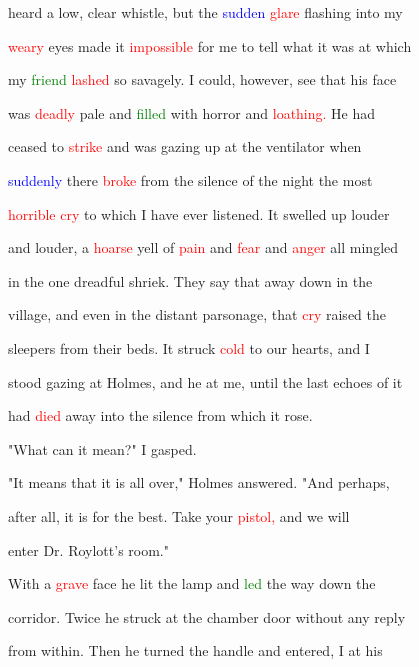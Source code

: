  heard a low, clear whistle, but the \textcolor{blue}{sudden} \textcolor{red}{glare} flashing into my

 \textcolor{red}{weary} eyes made it \textcolor{red}{impossible} for me to tell what it was at which

 my \textcolor{green}{friend} \textcolor{red}{lashed} so savagely. I could, however, see that his face

 was \textcolor{red}{deadly} pale and \textcolor{green}{filled} with \textcolor{BurntOrange}{horror} and \textcolor{red}{loathing.} He had

 ceased to \textcolor{red}{strike} and was gazing up at the ventilator when

 \textcolor{blue}{suddenly} there \textcolor{red}{broke} from the silence of the night the most

 \textcolor{red}{horrible} \textcolor{red}{cry} to which I have ever listened. It swelled up louder

 and louder, a \textcolor{red}{hoarse} \textcolor{BurntOrange}{yell} of \textcolor{red}{pain} and \textcolor{red}{fear} and \textcolor{red}{anger} all mingled

 in the one \textcolor{BurntOrange}{dreadful} \textcolor{BurntOrange}{shriek.} They say that away down in the

 village, and even in the distant parsonage, that \textcolor{red}{cry} raised the

 sleepers from their beds. It struck \textcolor{red}{cold} to our hearts, and I

 stood gazing at Holmes, and he at me, until the last echoes of it

 had \textcolor{red}{died} away into the silence from which it rose.



 "What can it mean?" I gasped.



 "It means that it is all over," Holmes answered. "And perhaps,

 after all, it is for the best. Take your \textcolor{red}{pistol,} and we will

 enter Dr. Roylott's room."



 With a \textcolor{red}{grave} face he lit the lamp and \textcolor{green}{led} the way down the

 corridor. Twice he struck at the chamber door without any reply

 from within. Then he turned the handle and entered, I at his

